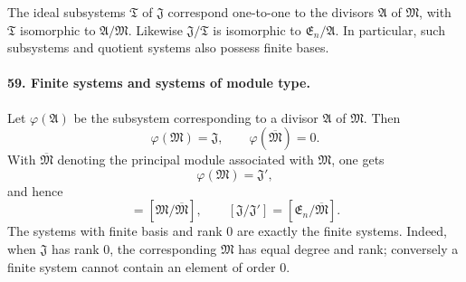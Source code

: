 \documentclass[11pt]{article}
\begin{document}
The ideal subsystems $\mathfrak T$ of $\mathfrak J$ correspond one-to-one to the divisors $\mathfrak A$ of $\mathfrak M$, with $\mathfrak T$ isomorphic to $\mathfrak A/\mathfrak M$. Likewise $\mathfrak J/\mathfrak T$ is isomorphic to $\mathfrak E_n/\mathfrak A$. In particular, such subsystems and quotient systems also possess finite bases.

\paragraph{59. Finite systems and systems of module type.}
Let $\varphi(\mathfrak A)$ be the subsystem corresponding to a divisor $\mathfrak A$ of $\mathfrak M$. Then
\begin{equation}
  \varphi(\mathfrak M)=\mathfrak J,
  \qquad
  \varphi(\overline{\mathfrak M})=0.
\tag{96}
\end{equation}
With $\overline{\mathfrak M}$ denoting the principal module associated with $\mathfrak M$, one gets
\begin{equation}
  \varphi(\mathfrak M)=\mathfrak J',
\tag{97}
\end{equation}
and hence
\begin{equation}
  [\mathfrak J']=[\mathfrak M/\overline{\mathfrak M}],
  \qquad
  [\mathfrak J/\mathfrak J']=[\mathfrak E_n/\overline{\mathfrak M}].
\tag{98}
\end{equation}
The systems with finite basis and rank $0$ are exactly the finite systems. Indeed, when $\mathfrak J$ has rank $0$, the corresponding $\mathfrak M$ has equal degree and rank; conversely a finite system cannot contain an element of order $0$.
\end{document}
